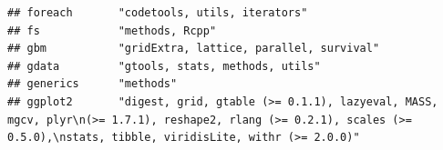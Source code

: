 \documentclass[]{article}
\begin{document}
\begin{verbatim}
## foreach       "codetools, utils, iterators"                                                                                                                                                                                                                                                                                                                                                                                                                                                         
## fs            "methods, Rcpp"                                                                                                                                                                                                                                                                                                                                                                                                                                                                       
## gbm           "gridExtra, lattice, parallel, survival"                                                                                                                                                                                                                                                                                                                                                                                                                                              
## gdata         "gtools, stats, methods, utils"                                                                                                                                                                                                                                                                                                                                                                                                                                                       
## generics      "methods"                                                                                                                                                                                                                                                                                                                                                                                                                                                                             
## ggplot2       "digest, grid, gtable (>= 0.1.1), lazyeval, MASS, mgcv, plyr\n(>= 1.7.1), reshape2, rlang (>= 0.2.1), scales (>= 0.5.0),\nstats, tibble, viridisLite, withr (>= 2.0.0)"                                                                                                                                                                                                                                                                                                               

\end{verbatim}
\end{document}
